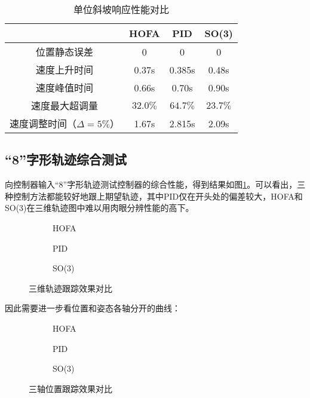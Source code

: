 \begin{table}[!h]
  \centering
  \caption{单位斜坡响应性能对比}
  \begin{tabular}{cccc}
      \toprule
      & HOFA & PID & SO(3) \\
      \midrule
    位置静态误差                  & 0    & 0 & 0 \\
    速度上升时间                   & 0.37s & 0.385s &0.48s \\
    速度峰值时间                  & 0.66s &0.70s  & 0.90s\\
    速度最大超调量                & $32.0\%$ & $64.7\%$  & $23.7\%$\\
    速度调整时间（$\Delta = 5\%$） & 1.67s &2.815s  & 2.09s\\
      \bottomrule
  \end{tabular}
  \label{matlab斜坡对比}
\end{table}
\newpage
\subsection*{“8”字形轨迹综合测试}
  向控制器输入“8”字形轨迹测试控制器的综合性能，得到结果如图\ref{matlab_3d}。可以看出，三种控制方法都能较好地跟上期望轨迹，其中PID仅在开头处的偏差较大，HOFA和SO(3)在三维轨迹图中难以用肉眼分辨性能的高下。
  \begin{figure}[!h]
      \centering
      \begin{subfigure}[t]{0.33\textwidth}
        \centering
        \caption{HOFA}
      \end{subfigure}\hfill
      \begin{subfigure}[t]{0.33\textwidth}
        \centering
        \caption{PID}
      \end{subfigure}\hfill
      \begin{subfigure}[t]{0.33\textwidth}
        \centering
        \caption{SO(3)}
      \end{subfigure}
      \caption{三维轨迹跟踪效果对比}
      \label{matlab_3d}
  \end{figure}
  因此需要进一步看位置和姿态各轴分开的曲线：
  \begin{figure}[!h]
    \centering
    \begin{subfigure}[t]{0.33\textwidth}
      \centering
      \caption{HOFA}
    \end{subfigure}\hfill
    \begin{subfigure}[t]{0.33\textwidth}
      \centering
      \caption{PID}
    \end{subfigure}\hfill
    \begin{subfigure}[t]{0.33\textwidth}
      \centering
      \caption{SO(3)}
    \end{subfigure}
    \caption{三轴位置跟踪效果对比}
    \label{matlab_x}
\end{figure}

